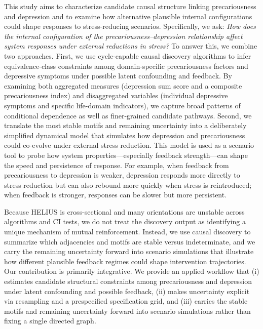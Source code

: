 \documentclass[
]{article}
\begin{document}
\textcolor{BrickRed}{This study aims to characterize candidate causal structure linking precariousness and depression and to examine how alternative plausible internal configurations could shape responses to stress-reducing scenarios. Specifically, we ask: \textit{How does the internal configuration of the precariousness–depression relationship affect system responses under external reductions in stress?}
To answer this, we combine two approaches. First, we use cycle-capable causal discovery algorithms to infer equivalence-class constraints among domain-specific precariousness factors and depressive symptoms under possible latent confounding and feedback.
By examining both aggregated measures (depression sum score and a composite precariousness index) and disaggregated variables (individual depressive symptoms and specific life-domain indicators), we capture broad patterns of conditional dependence as well as finer-grained candidate pathways.
Second, we translate the most stable motifs and remaining uncertainty into a deliberately simplified dynamical model that simulates how depression and precariousness could co-evolve under external stress reduction.
This model is used as a scenario tool to probe how system properties—especially feedback strength—can shape the speed and persistence of response. For example, when feedback from precariousness to depression is weaker, depression responds more directly to stress reduction but can also rebound more quickly when stress is reintroduced; when feedback is stronger, responses can be slower but more persistent.}

\textcolor{BrickRed}{Because HELIUS is cross-sectional and many orientations are unstable across algorithms and CI tests, we do not treat the discovery output as identifying a unique mechanism of mutual reinforcement. Instead, we use causal discovery to summarize which adjacencies and motifs are stable versus indeterminate, and we carry the remaining uncertainty forward into scenario simulations that illustrate how different plausible feedback regimes could shape intervention trajectories.}
\textcolor{BrickRed}{Our contribution is primarily integrative. We provide an applied workflow that (i) estimates candidate structural constraints among precariousness and depression under latent confounding and possible feedback, (ii) makes uncertainty explicit via resampling and a prespecified specification grid, and (iii) carries the stable motifs and remaining uncertainty forward into scenario simulations rather than fixing a single directed graph.}
\end{document}
